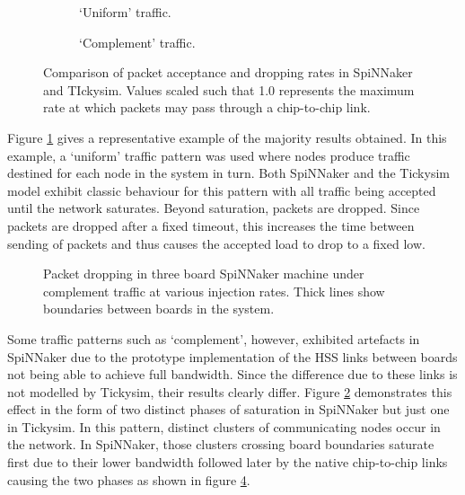 			\begin{figure}
				\begin{subfigure}{\textwidth}
					
					
					\caption{`Uniform' traffic.}
					\label{fig:results-144-accuracy-cyclic}
				\end{subfigure}
				
				\vspace{1em}
				
				\begin{subfigure}{\textwidth}
					
					
					\caption{`Complement' traffic.}
					\label{fig:results-144-accuracy-complement}
				\end{subfigure}
				
				\caption[Packet acceptance and dropping in SpiNNaker
				and TIckysim.]{Comparison of packet acceptance and dropping rates in
				SpiNNaker and TIckysim. Values scaled such that 1.0 represents the
				maximum rate at which packets may pass through a chip-to-chip link.}
				\label{fig:results-144-accuracy}
			\end{figure}
			
			Figure \ref{fig:results-144-accuracy-cyclic} gives a representative
			example of the majority results obtained. In this example, a `uniform'
			traffic pattern was used where nodes produce traffic destined for each
			node in the system in turn. Both SpiNNaker and the Tickysim model exhibit
			classic behaviour for this pattern with all traffic being accepted until
			the network saturates.  Beyond saturation, packets are dropped. Since
			packets are dropped after a fixed timeout, this increases the time between
			sending of packets and thus causes the accepted load to drop to a fixed
			low.
			
			\begin{figure}
				\center
				
				\caption{Packet dropping in three board SpiNNaker machine under
				complement traffic at various injection rates. Thick lines show boundaries
				between boards in the system.}
				\label{fig:heatmap-spinnaker-complement}
			\end{figure}
			
			Some traffic patterns such as `complement', however, exhibited artefacts
			in SpiNNaker due to the prototype implementation of the HSS links between
			boards not being able to achieve full bandwidth. Since the difference due
			to these links is not modelled by Tickysim, their results clearly differ.
			Figure \ref{fig:results-144-accuracy-complement} demonstrates this effect
			in the form of two distinct phases of saturation in SpiNNaker but just one
			in Tickysim. In this pattern, distinct clusters of communicating nodes
			occur in the network. In SpiNNaker, those clusters crossing board
			boundaries saturate first due to their lower bandwidth followed later by
			the native chip-to-chip links causing the two phases as shown in figure
			\ref{fig:heatmap-spinnaker-complement}.
		

